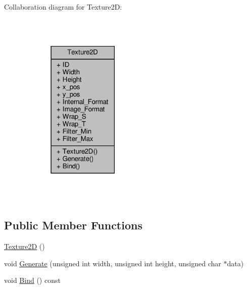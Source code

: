 Collaboration diagram for Texture2D\+:
\nopagebreak
\begin{figure}[H]
\begin{center}
\leavevmode
\includegraphics[width=174pt]{classTexture2D__coll__graph}
\end{center}
\end{figure}
\subsection*{Public Member Functions}
\begin{DoxyCompactItemize}
\item 
\hyperlink{classTexture2D_ab62c7c5172a4800b4629cd475147819d}{Texture2D} ()
\item 
void \hyperlink{classTexture2D_a29768bc9e468322d8b6b86374890c2cc}{Generate} (unsigned int width, unsigned int height, unsigned char $\ast$data)
\item 
void \hyperlink{classTexture2D_a97cc1e27512b8f520a59473e6657d7d9}{Bind} () const
\end{DoxyCompactItemize}
